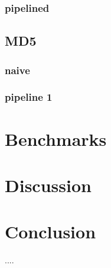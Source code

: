 \documentclass[a4paper]{article}
\begin{document}
\subsubsection{pipelined}
\label{sec:orge51b51f}

\subsection{MD5}
\label{sec:org569162a}

\subsubsection{naive}
\label{sec:org83ea0bf}

\subsubsection{pipeline 1}
\label{sec:orgaba6e49}

\section{Benchmarks}
\label{sec:org7091b49}

\section{Discussion}
\label{sec:orgd77dfaa}

\section{Conclusion}
\label{sec:orge590f03}




\begin{appendix}

....

\end{appendix}
\end{document}
